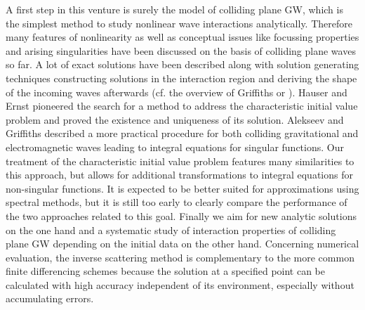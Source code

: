 \documentclass[12pt]{iopart}
\begin{document}
A first step in this venture is surely the model of colliding plane GW, which is the simplest method to study nonlinear wave interactions analytically.
Therefore many features of nonlinearity as well as conceptual issues like focussing properties and arising singularities have been discussed on the basis of colliding plane waves so far.
A lot of exact solutions have been described along with solution generating techniques constructing solutions in the interaction region and deriving the shape of the incoming waves afterwards (cf. the overview of Griffiths \cite{Griffiths1991} or \cite{Griffiths_Podolsky2009}). Hauser and Ernst \cite{Hauser_ErnstI1989,Hauser_ErnstII1989,Hauser_ErnstIII1990,Hauser_ErnstIV1991,Hauser_Ernst_GerochConjecture2001} pioneered the search for a method to address the characteristic initial value problem and proved the existence and uniqueness of its solution.
Alekseev and Griffiths \cite{Alekseev_Griffiths2001,Alekseev_Griffiths2004} described a more practical procedure for both colliding gravitational and electromagnetic waves leading to integral equations for singular functions. Our treatment of the characteristic initial value problem features many similarities to this approach, but allows for additional transformations to integral equations for non-singular functions. It is expected to be better suited for approximations using spectral methods, but it is still too early to clearly compare the performance of the two approaches related to this goal. Finally we aim for new analytic solutions on the one hand and a systematic study of interaction properties of colliding plane GW depending on the initial data on the other hand. Concerning numerical evaluation, the inverse scattering method is complementary to the more common finite differencing schemes because the solution at a specified point can be calculated with high accuracy independent of its environment, especially without accumulating errors.
\end{document}
